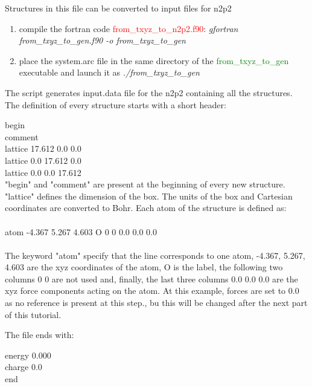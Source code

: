 \documentclass[12pt]{article}
\begin{document}
Structures in this file can be converted to input files for n2p2 

\begin{enumerate}
    \item compile the fortran code \textcolor{red}{from\_txyz\_to\_n2p2.f90}:
    \textit{gfortran from\_txyz\_to\_gen.f90 -o from\_txyz\_to\_gen} 
    \item place the system.arc file in the same directory of the \textcolor{green}{from\_txyz\_to\_gen} executable and launch it as \textit{./from\_txyz\_to\_gen}
\end{enumerate}
The script generates input.data file for the n2p2 containing all the structures. The definition of every structure starts with a short header:

 begin \\
 comment \\
 lattice 17.612 0.0 0.0 \\
 lattice 0.0 17.612 0.0 \\
 lattice 0.0 0.0 17.612 \\

"begin" and "comment" are present at the beginning of every new structure. "lattice" defines the dimension of the box. The units of the box and Cartesian coordinates are converted to Bohr.
Each atom of the structure is defined as: \\ \\
 atom \hspace{0.5cm}  -4.367  \hspace{0.5cm}      5.267    \hspace{0.5cm}    4.603  \hspace{0.5cm}    O \hspace{0.5cm} 0 0 \hspace{0.5cm} 0.0 0.0 0.0 \\ \\
The keyword "atom" specify that the line corresponds to one atom, -4.367, 5.267, 4.603 are the xyz coordinates of the atom, O is the label, the following two columns 0 0 are not used  and, finally, the last three columns 0.0 0.0 0.0 are the xyz force components acting on the atom. At this example, forces are set to 0.0 as no reference is present at this step., bu this will be changed after the next part of this tutorial.

The file ends with: 

 energy 0.000 \\
 charge 0.0 \\
 end \\
\end{document}
